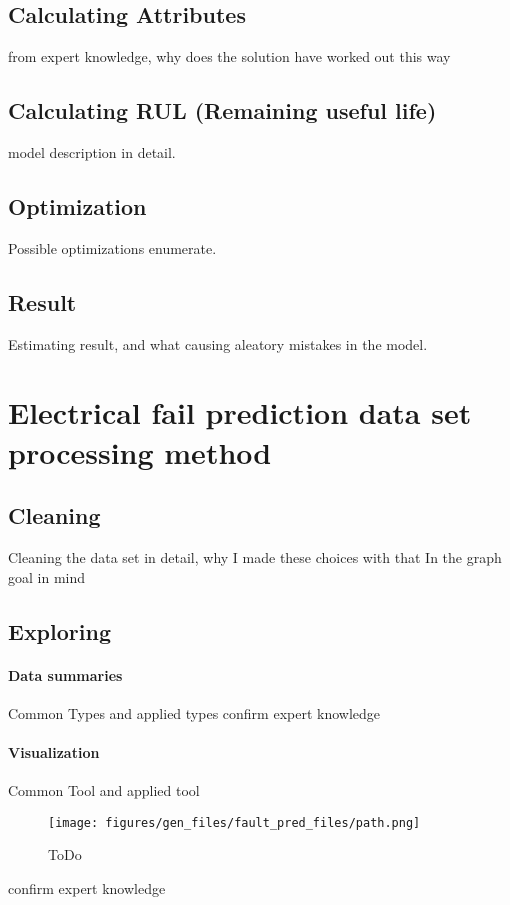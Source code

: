 \subsection{Calculating Attributes}
	from expert knowledge, why does the solution have worked out this way
\subsection{Calculating RUL (Remaining useful life)}
	model description in detail.
\subsection{Optimization}
Possible optimizations enumerate.
\subsection{Result}
Estimating result, and what causing aleatory mistakes in the model. 
\section{Electrical fail prediction data set processing method}
	\subsection{Cleaning}
Cleaning the data set in detail, why I made these choices with that In the graph goal in mind
	\subsection{Exploring}
		\paragraph{Data summaries}
		Common Types and applied types
		confirm expert knowledge
		\paragraph{Visualization}
		Common Tool and applied tool
			\begin{figure}[!ht]
			\centering
			\texttt{[image: figures/gen\_files/fault\_pred\_files/path.png]}
			\caption{ToDo} 
			\end{figure}
		confirm expert knowledge

